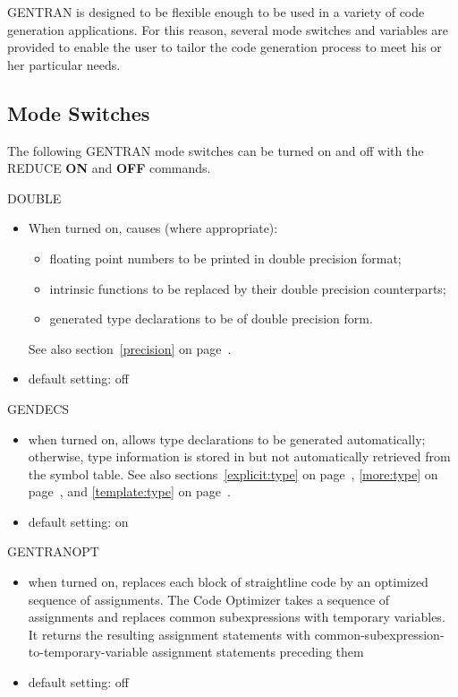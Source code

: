 GENTRAN is designed to be flexible enough to be used in a variety of
code generation applications.  For this reason, several mode
switches and variables are provided to enable the user to tailor the
code generation process to meet his or her particular needs.

\subsection{Mode Switches}
The following GENTRAN mode switches can be turned on and off with the
REDUCE {\bf ON} and {\bf OFF} commands.

\begin{describe}{DOUBLE}
 
\begin{itemize}
\item When turned on, causes (where appropriate):
\begin{itemize}
\item floating point numbers to be printed in double precision format;
\item intrinsic functions to be replaced by their double precision
counterparts;
\item generated type declarations to be of double precision form.
\end{itemize}
See also section~\ref{precision} on page~\pageref{precision}.
\item default setting: off
\end{itemize}
\end{describe}

\begin{describe}{GENDECS}
\begin{itemize}
\item when turned on, allows type declarations to be generated automatically;
otherwise, type information is stored in but not automatically retrieved
from the symbol table.  See also sections~\ref{explicit:type} on
page~\pageref{explicit:type}, \ref{more:type} on page~\pageref{more:type},
and \ref{template:type} on page~\pageref{template:type}.
\item default setting:  on
\end{itemize}
\end{describe}

\begin{describe}{GENTRANOPT}
\begin{itemize}
\item when turned on, replaces each block of straightline code by
an optimized sequence of assignments.
The Code Optimizer takes a sequence of assignments and replaces common
subexpressions with temporary variables.  It returns the resulting assignment
statements with common-subexpression-to-temporary-variable assignment
statements preceding them
\item default setting:  off
\end{itemize} 
\end{describe} 

